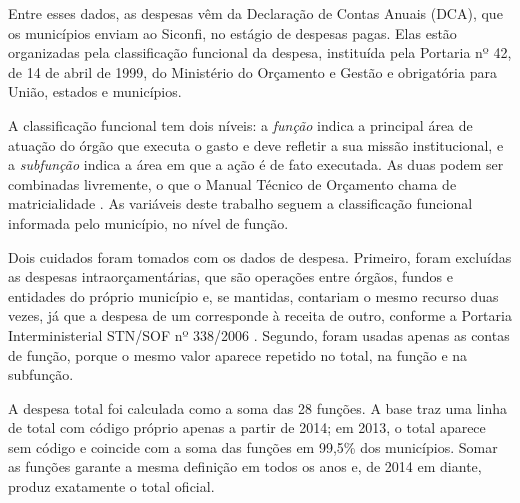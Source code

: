 Entre esses dados, as despesas vêm da Declaração de Contas Anuais (DCA), que os municípios enviam ao Siconfi, no estágio de despesas pagas. Elas estão organizadas pela classificação funcional da despesa, instituída pela Portaria nº 42, de 14 de abril de 1999, do Ministério do Orçamento e Gestão \parencite{portaria42_1999} e obrigatória para União, estados e municípios.

A classificação funcional tem dois níveis: a \emph{função} indica a principal área de atuação do órgão que executa o gasto e deve refletir a sua missão institucional, e a \emph{subfunção} indica a área em que a ação é de fato executada. As duas podem ser combinadas livremente, o que o Manual Técnico de Orçamento chama de matricialidade \parencite{mto2023}. As variáveis deste trabalho seguem a classificação funcional informada pelo município, no nível de função.

Dois cuidados foram tomados com os dados de despesa. Primeiro, foram excluídas as despesas intraorçamentárias, que são operações entre órgãos, fundos e entidades do próprio município e, se mantidas, contariam o mesmo recurso duas vezes, já que a despesa de um corresponde à receita de outro, conforme a Portaria Interministerial STN/SOF nº 338/2006 \parencite{portaria338_2006}. Segundo, foram usadas apenas as contas de função, porque o mesmo valor aparece repetido no total, na função e na subfunção.

A despesa total foi calculada como a soma das 28 funções. A base traz uma linha de total com código próprio apenas a partir de 2014; em 2013, o total aparece sem código e coincide com a soma das funções em 99,5\% dos municípios. Somar as funções garante a mesma definição em todos os anos e, de 2014 em diante, produz exatamente o total oficial.

